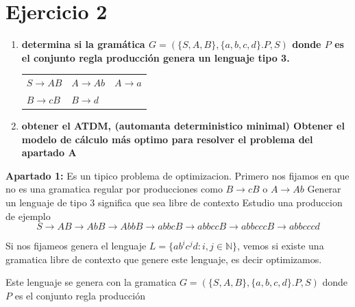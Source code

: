 \documentclass{article}
\begin{document}
            
            

                
        \newpage





        \section*{Ejercicio 2}
        \begin{enumerate}
            \item \textbf{determina si la gramática $G = (\{S,A,B\}, \{a,b,c,d\}. P,S)$ donde $P$ es el conjunto regla producción
            genera un lenguaje tipo 3.}
            
            \begin{tabularx}{\textwidth}{XXX}
                $S \rightarrow AB$ & $A \rightarrow Ab$ & $A \rightarrow a$\\
                $B \rightarrow cB$ & $B \rightarrow d$\\
            \end{tabularx}
            
            \item \textbf{obtener el ATDM, (automanta deterministico minimal)
            Obtener el modelo de cálculo más optimo para resolver el problema del apartado A}
        \end{enumerate}
        
        \vspace{\baselineskip} %

        \textbf{Apartado 1:}
        Es un tipico problema de optimizacion. Primero nos fijamos en que no es una gramatica regular por producciones
        como $B \rightarrow cB$ o $A \rightarrow Ab$
        Generar un lenguaje de tipo 3 significa que sea libre de contexto
        Estudio una produccion de ejemplo
        $$ S \rightarrow AB \rightarrow AbB \rightarrow AbbB \rightarrow abbcB \rightarrow abbccB \rightarrow abbcccB \rightarrow abbcccd$$ 

        Si nos fijameos genera el lenguaje $L = \{ab^ic^jd : i, j \in \mathbb{N}  \}$, vemos si existe una gramatica libre de contexto que genere este lenguaje,
        es decir optimizamos.

        \vspace{\baselineskip} %
        Este lenguaje se genera con la gramatica $G = (\{S,A,B\}, \{a,b,c,d\}. P,S)$ donde $P$ es el conjunto regla producción
        \vspace{\baselineskip} %
\end{document}
